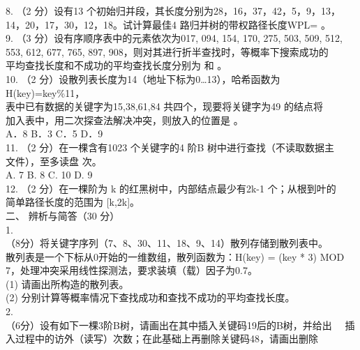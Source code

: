 \begin{question}
8. （2 分）设有13 个初始归并段，其长度分别为28，16，37，42，5，9，13，\\
14，20，17，30，12，18。试计算最佳4 路归并树的带权路径长度WPL= \underline{\hspace{4em}}。\\
9. （3 分）设有序顺序表中的元素依次为017, 094, 154, 170, 275, 503, 509, 512,\\
553, 612, 677, 765, 897, 908，则对其进行折半查找时，等概率下搜索成功的\\
平均查找长度和不成功的平均查找长度分别为 \underline{\hspace{4em}} 和 \underline{\hspace{4em}}。\\
10. （2 分）设散列表长度为14（地址下标为0…13），哈希函数为H(key)=key\%11，\\
表中已有数据的关键字为15,38,61,84 共四个，现要将关键字为49 的结点将\\
加入表中，用二次探查法解决冲突，则放入的位置是 \underline{\hspace{2em}}。\\
A．8           B．3           C．5            D．9\\
11. （2 分）在一棵含有1023 个关键字的4 阶B 树中进行查找（不读取数据主\\
文件），至多读盘 \underline{\hspace{2em}} 次。\\
A. 7           B. 8            C.  10          D. 9\\
12. （2 分）在一棵阶为 k 的红黑树中，内部结点最少有2k-1 个；从根到叶的\\
简单路径长度的范围为 [k,2k]。\\
二、 辨析与简答（30 分）\\
1.\\
（8分）将关键字序列（7、8、30、11、18、9、14）散列存储到散列表中。\\
散列表是一个下标从0开始的一维数组，散列函数为：H(key) = (key * 3) MOD\\
7，处理冲突采用线性探测法，要求装填（载）因子为0.7。\\
(1) 请画出所构造的散列表。\\
(2) 分别计算等概率情况下查找成功和查找不成功的平均查找长度。\\
2.\\
（6分）设有如下一棵3阶B树，请画出在其中插入关键码19后的B树，并给出\
\
插入过程中的访外（读写）次数；在此基础上再删除关键码48，请画出删除\\

\end{question}
